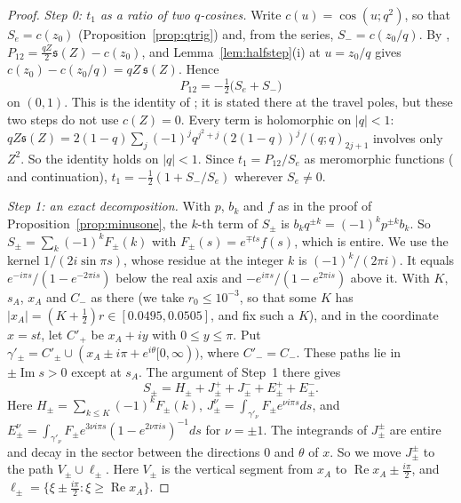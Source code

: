 \documentclass[11pt]{article}
\theoremstyle{plain}
\theoremstyle{definition}
\theoremstyle{remark}
\theoremstyle{plain}\newtheorem*{maintheorem}{Main Theorem}
\begin{document}
\begin{proof}
\emph{Step 0: $t_1$ as a ratio of two $q$-cosines.} Write $c(u)=\cos(u;q^2)$, so that
$S_e=c(z_0)$ (Proposition~\ref{prop:qtrig}) and, from the series, $S_-=c(z_0/q)$. By
\cite[Lemma ``the gate block in closed form'', \textup{lem:P12closed}]{Bonfioli2026bB},
$P_{12}=\tfrac{qZ}2\mathfrak s(Z)-c(z_0)$, and Lemma~\ref{lem:halfstep}\textup{(i)} at $u=z_0/q$ gives
$c(z_0)-c(z_0/q)=qZ\,\mathfrak s(Z)$. Hence
\[
   P_{12}=-\tfrac12\bigl(S_e+S_-\bigr)
\]
on $(0,1)$. This is the identity of \cite[Proposition \textup{prop:P12second}]{Bonfioli2026bB}; it
is stated there at the travel poles, but these two steps do not use $c(Z)=0$. Every term is
holomorphic on $|q|<1$: $qZ\mathfrak s(Z)=2(1-q)\sum_j(-1)^jq^{j^2+j}(2(1-q))^j/(q;q)_{2j+1}$
involves only $Z^2$. So the identity holds on $|q|<1$. Since $t_1=P_{12}/S_e$ as meromorphic
functions (\cite[Corollary \textup{cor:cocycle}]{Bonfioli2026bB} and continuation),
$t_1=-\frac12(1+S_-/S_e)$ wherever $S_e\ne0$.

\emph{Step 1: an exact decomposition.} With $p$, $b_k$ and $f$ as in the proof of
Proposition~\ref{prop:minusone}, the $k$-th term of $S_\pm$ is $b_kq^{\pm k}=(-1)^kp^{\pm k}b_k$.
So $S_\pm=\sum_k(-1)^kF_\pm(k)$ with $F_\pm(s)=e^{\mp ts}f(s)$, which is entire. We use the
kernel $1/(2i\sin\pi s)$, whose residue at the integer $k$ is $(-1)^k/(2\pi i)$. It equals
$e^{-i\pi s}/(1-e^{-2\pi is})$ below the real axis and $-e^{i\pi s}/(1-e^{2\pi is})$ above it. With
$K$, $s_A$, $x_A$ and $C_-$ as there (we take $r_0\le10^{-3}$, so that some $K$ has
$|x_A|=(K+\frac12)r\in[0.0495,0.0505]$, and fix such a $K$), and in the coordinate $x=st$, let
$C'_+$ be $x_A+iy$ with
$0\le y\le\pi$. Put $\gamma'_\pm=C'_\pm\cup(x_A\pm i\pi+e^{i\theta}[0,\infty))$, where $C'_-=C_-$.
These paths lie in $\pm\operatorname{Im}s>0$ except at $s_A$. The argument of Step~1 there gives
\[
   S_\pm=H_\pm+J^+_\pm+J^-_\pm+E^+_\pm+E^-_\pm .
\]
Here $H_\pm=\sum_{k\le K}(-1)^kF_\pm(k)$, $J^\nu_\pm=\int_{\gamma'_\nu}F_\pm e^{\nu i\pi s}ds$,
and $E^\nu_\pm=\int_{\gamma'_\nu}F_\pm e^{3\nu i\pi s}(1-e^{2\nu\pi is})^{-1}ds$ for
$\nu=\pm1$. The integrands of $J^\pm_\pm$ are entire and decay in the sector between the
directions $0$ and $\theta$ of $x$. So we move $J^\pm_\pm$ to the path $V_\pm\cup\ell_\pm$. Here
$V_\pm$ is the vertical segment from $x_A$ to $\operatorname{Re}x_A\pm\frac{i\pi}2$, and
$\ell_\pm=\{\xi\pm\frac{i\pi}2:\xi\ge\operatorname{Re}x_A\}$.


\end{proof}
\end{document}

